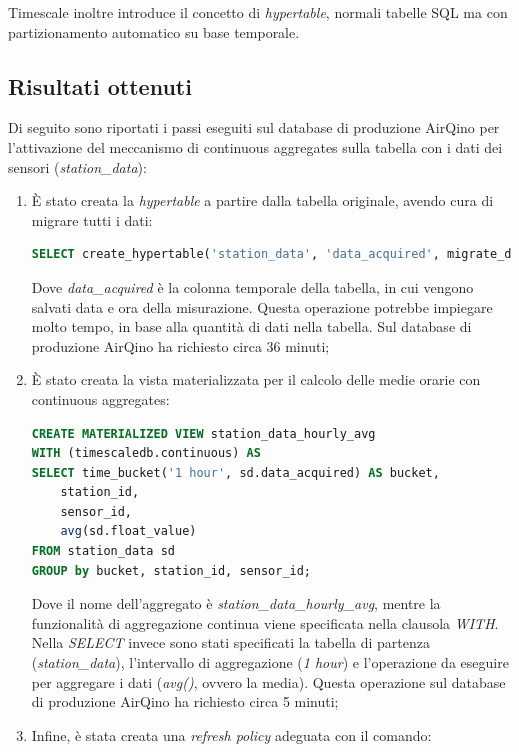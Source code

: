 Timescale inoltre introduce il concetto di \textit{hypertable}, normali tabelle SQL ma con partizionamento automatico su base temporale.

\subsection{Risultati ottenuti}\label{ssec:cont-aggr-risultati}
Di seguito sono riportati i passi eseguiti sul database di produzione AirQino per l'attivazione del meccanismo di continuous aggregates sulla tabella con i dati dei sensori (\textit{station\_data}):

\begin{enumerate}
  \item  È stato creata la \textit{hypertable} a partire dalla tabella originale, avendo cura di migrare tutti i dati:
\vspace{1mm}
\begin{lstlisting}[language=sql]
SELECT create_hypertable('station_data', 'data_acquired', migrate_data => true);
\end{lstlisting}
Dove \textit{data\_acquired} è la colonna temporale della tabella, in cui vengono salvati data e ora della misurazione.
Questa operazione potrebbe impiegare molto tempo, in base alla quantità di dati nella tabella. Sul database di produzione AirQino ha richiesto circa 36 minuti;
  \item È stato creata la vista materializzata per il calcolo delle medie orarie con continuous aggregates:
\vspace{1mm}
\begin{lstlisting}[language=sql]
CREATE MATERIALIZED VIEW station_data_hourly_avg
WITH (timescaledb.continuous) AS
SELECT time_bucket('1 hour', sd.data_acquired) AS bucket, 
    station_id,  
    sensor_id, 
    avg(sd.float_value) 
FROM station_data sd
GROUP by bucket, station_id, sensor_id;
\end{lstlisting}
Dove il nome dell'aggregato è \textit{station\_data\_hourly\_avg}, mentre la funzionalità di aggregazione continua viene specificata nella clausola \textit{WITH}. Nella \textit{SELECT} invece sono stati specificati la tabella di partenza (\textit{station\_data}), l'intervallo di aggregazione (\textit{1 hour}) e l'operazione da eseguire per aggregare i dati (\textit{avg()}, ovvero la media).
Questa operazione sul database di produzione AirQino ha richiesto circa 5 minuti;
  \item Infine, è stata creata una \textit{refresh policy} adeguata con il comando:
\vspace{1mm}

\end{enumerate}
